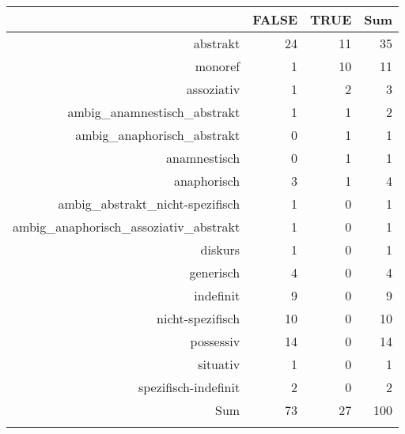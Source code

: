\begin{tabular}{rrrr}
  \lsptoprule
 & FALSE & TRUE & Sum \\ 
  \midrule
abstrakt & 24 & 11 & 35 \\ 
  monoref & 1 & 10 & 11 \\ 
  assoziativ & 1 & 2 & 3 \\ 
  ambig\_anamnestisch\_abstrakt & 1 & 1 & 2 \\ 
  ambig\_anaphorisch\_abstrakt & 0 & 1 & 1 \\ 
  anamnestisch & 0 & 1 & 1 \\ 
  anaphorisch & 3 & 1 & 4 \\ 
  ambig\_abstrakt\_nicht-spezifisch & 1 & 0 & 1 \\ 
  ambig\_anaphorisch\_assoziativ\_abstrakt & 1 & 0 & 1 \\ 
  diskurs & 1 & 0 & 1 \\ 
  generisch & 4 & 0 & 4 \\ 
  indefinit & 9 & 0 & 9 \\ 
  nicht-spezifisch & 10 & 0 & 10 \\ 
  possessiv & 14 & 0 & 14 \\ 
  situativ & 1 & 0 & 1 \\ 
  spezifisch-indefinit & 2 & 0 & 2 \\ 
  Sum & 73 & 27 & 100 \\ 
   \lspbottomrule
\end{tabular}
